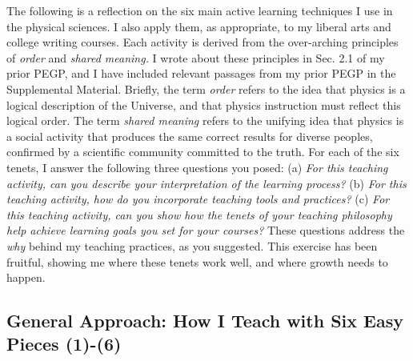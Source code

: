 \documentclass[../../../main.tex]{subfiles}
\begin{document}
The following is a reflection on the six main active learning techniques I use in the physical sciences.  I also apply them, as appropriate, to my liberal arts and college writing courses.  Each activity is derived from the over-arching principles of \textit{order} and \textit{shared meaning.}  I wrote about these principles in Sec. 2.1 of my prior PEGP, and I have included relevant passages from my prior PEGP in the Supplemental Material.  Briefly, the term \textit{order} refers to the idea that physics is a logical description of the Universe, and that physics instruction must reflect this logical order.  The term \textit{shared meaning} refers to the unifying idea that physics is a social activity that produces the same correct results for diverse peoples, confirmed by a scientific community committed to the truth.  For each of the six tenets, I answer the following three questions you posed: (a) \textit{For this teaching activity, can you describe your interpretation of the learning process?} (b) \textit{For this teaching activity, how do you incorporate teaching tools and practices?} (c) \textit{For this teaching activity, can you show how the tenets of your teaching philosophy help achieve learning goals you set for your courses?} These questions address the \textit{why} behind my teaching practices, as you suggested.  This exercise has been fruitful, showing me where these tenets work well, and where growth needs to happen.

\subsection{General Approach: How I Teach with Six Easy Pieces (1)-(6)}
\end{document}
